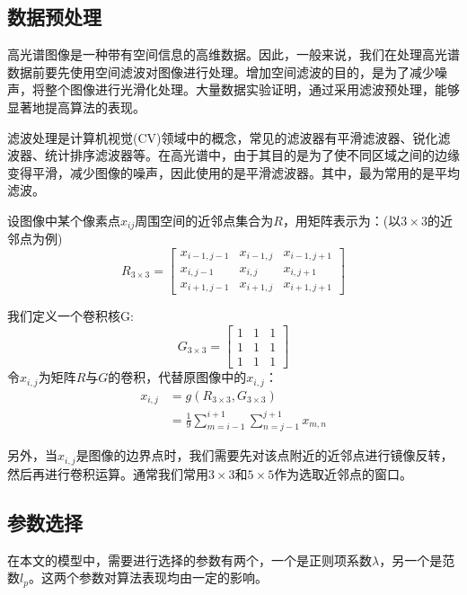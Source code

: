 \documentclass[12pt,a4paper]{article}
\begin{document}
\subsection{数据预处理}
高光谱图像是一种带有空间信息的高维数据。因此，一般来说，我们在处理高光谱数据前要先使用空间滤波对图像进行处理。增加空间滤波的目的，是为了减少噪声，将整个图像进行光滑化处理。大量数据实验证明，通过采用滤波预处理，能够显著地提高算法的表现。

滤波处理是计算机视觉(CV)领域中的概念，常见的滤波器有平滑滤波器、锐化滤波器、统计排序滤波器等。在高光谱中，由于其目的是为了使不同区域之间的边缘变得平滑，减少图像的噪声，因此使用的是平滑滤波器。其中，最为常用的是平均滤波。

设图像中某个像素点$x_{ij}$周围空间的近邻点集合为$R$，用矩阵表示为：(以$3 \times 3$的近邻点为例)
\begin{equation}
R_{3\times 3} = 
\left[\begin{array}{ccc}
x_{i - 1, j - 1} & x_{i - 1, j} & x_{i - 1, j + 1} \\
x_{i, j - 1} & x_{i, j} & x_{i, j + 1} \\
x_{i + 1, j - 1} & x_{i + 1, j} & x_{i + 1, j + 1}
\end{array}\right]
\end{equation}

我们定义一个卷积核G:
\begin{equation}
G_{3\times 3} = 
\left[\begin{array}{ccc}
1 & 1 & 1 \\
1 & 1 & 1 \\
1 & 1 & 1
\end{array}\right]
\end{equation}
令$x_{i, j}$为矩阵$R$与$G$的卷积，代替原图像中的$x_{i, j}$：
\begin{align*}
x_{i, j} & = g(R_{3 \times 3}, G_{3 \times 3}) \\	
		 & = \frac{1}{9} \sum_{m = i - 1}^{i + 1}\sum_{n = j - 1}^{j + 1}x_{m, n} 
\end{align*}

另外，当$x_{i,j}$是图像的边界点时，我们需要先对该点附近的近邻点进行镜像反转，然后再进行卷积运算。通常我们常用$3 \times 3$和$5 \times 5$作为选取近邻点的窗口。

\subsection{参数选择}
在本文的模型中，需要进行选择的参数有两个，一个是正则项系数$\lambda$，另一个是范数$l_{p}$。这两个参数对算法表现均由一定的影响。
\end{document}
